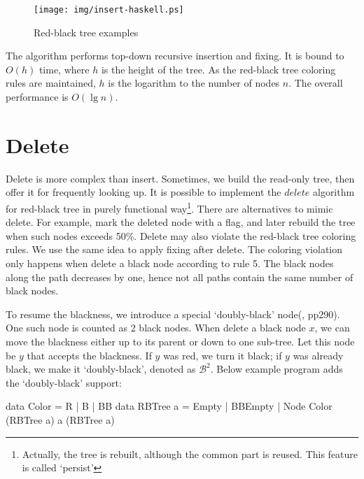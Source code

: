 \documentclass[b5paper]{article}
\begin{document}
\begin{figure}[htbp]
  \centering
  \texttt{[image: img/insert-haskell.ps]}
  \caption{Red-black tree examples}
  \label{fig:insert-example}
\end{figure}

The algorithm performs top-down recursive insertion and fixing. It is bound to $O(h)$ time, where $h$ is the height of the tree. As the red-black tree coloring rules are maintained, $h$ is the logarithm to the number of nodes $n$. The overall performance is $O(\lg n)$.

\begin{Exercise}
\end{Exercise}

\section{Delete}

Delete is more complex than insert. Sometimes, we build the read-only tree, then offer it for frequently looking up\cite{okasaki-blog}. It is possible to implement the $delete$ algorithm for red-black tree in purely functional way\footnote{Actually, the tree is rebuilt, although the common part is reused. This feature is called `persist'}. There are alternatives to mimic delete. For example, mark the deleted node with a flag, and later rebuild the tree when such nodes exceeds 50\%. Delete may also violate the red-black tree coloring rules. We use the same idea to apply fixing after delete. The coloring violation only happens when delete a black node according to rule 5. The black nodes along the path decreases by one, hence not all paths contain the same number of black nodes.

To resume the blackness, we introduce a special `doubly-black' node(\cite{CLRS}, pp290). One such node is counted as 2 black nodes. When delete a black node $x$, we can move the blackness either up to its parent or down to one sub-tree. Let this node be $y$ that accepts the blackness. If $y$ was red, we turn it black; if $y$ was already black, we make it `doubly-black', denoted as $\mathcal{B}^2$. Below example program adds the `doubly-black' support:

\begin{Haskell}
data Color = R | B | BB
data RBTree a = Empty | BBEmpty
              | Node Color (RBTree a) a (RBTree a)
\end{Haskell}
\end{document}
